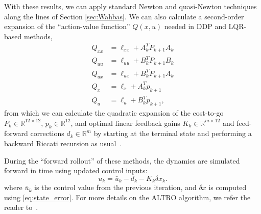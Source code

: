 \documentclass[letterpaper, 10 pt, conference]{ieeeconf}  %
\newcommand{\R}{\mathbb{R}}
\begin{document}
	With these results, we can apply standard Newton and quasi-Newton techniques along the lines of Section \ref{sec:Wahbas}. We can also calculate a second-order expansion of the ``action-value function'' $Q(x,u)$ needed in DDP and LQR-based methods,
    \begin{align}
        Q_{xx} &= \ell_{xx} + A_{k}^T P_{k+1} A_{k} \label{Qxx_exp}\\
        Q_{uu} &= \ell_{uu} + B_{k}^T P_{k+1} B_{k} \label{Quu_exp}\\
        Q_{ux} &= \ell_{ux} + B_{k}^T P_{k+1} A_{k} \label{Qux_exp}\\
        Q_x &= \ell_x  + A_{k}^T p_{k+1} \label{Qx_exp}\\
        Q_u &= \ell_u + B_{k}^T p_{k+1} \label{Qu_exp},
    \end{align}
    from which we can calculate the quadratic expansion of the cost-to-go 
    $P_k \in \R^{12 \times 12}$, $p_k \in \R^{12}$, and optimal linear feedback gains 
    $K_k \in \R^{m \times 12}$ and feed-forward corrections $d_k \in \R^m$ by starting at the terminal state and
    performing a backward Riccati recursion as usual~\cite{li2004iterative,howell2019altro}.
    
    During the ``forward rollout'' of these methods, the dynamics are simulated forward in time using updated control inputs: 
    \begin{equation} \label{eq:mlqr_control}
        u_k = \bar{u}_k - d_k - K_k \delta x_k.
    \end{equation}
    where $\bar{u}_k$ is the control value from the previous iteration, and $\delta x$ is
    computed using \eqref{eq:state_error}. %
    For more details on the ALTRO algorithm, we refer the reader to~\cite{howell2019altro}.
\end{document}
